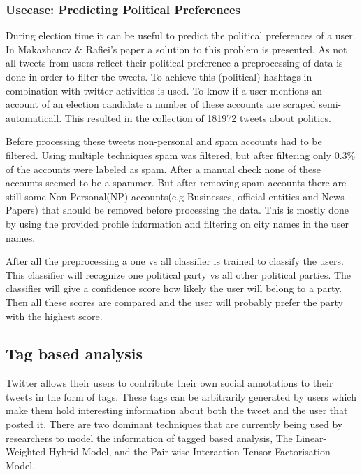 \documentclass{article}
\begin{document}
\subsubsection{Usecase: Predicting Political Preferences}
During election time it can be useful to predict the political preferences of a user. In Makazhanov \& Raﬁei's paper a solution to this problem is presented. As not all tweets from users reflect their political preference a preprocessing of data is done in order to filter the tweets. \cite{pol} To achieve this (political) hashtags in combination with twitter activities is used. To know if a user mentions an account of an election candidate a number of these accounts are scraped semi-automaticall. This resulted in the collection of 181972 tweets about politics.\cite{pol}

Before processing these tweets non-personal and spam accounts had to be filtered. Using multiple techniques spam was filtered, but after filtering only 0.3\% of the accounts were labeled as spam. After a manual check none of these accounts seemed to be a spammer. But after removing spam accounts there are still some Non-Personal(NP)-accounts(e.g Businesses, official entities and News Papers)  that should be removed before processing the data. This is mostly done by using the provided profile information and filtering on city names in the user names.  \cite{pol}

After all the preprocessing a one vs all classifier is trained to classify the users. This classifier will recognize one political party vs all other political parties. The classifier will give a confidence score how likely the user will belong to a party. Then all these scores are compared and the user will probably prefer the party with the highest score.  \cite{pol}
\subsection{Tag based analysis}

Twitter allows their users to contribute their own social annotations to their tweets in the form of tags. These tags can be arbitrarily generated by users 
which make them hold interesting information about both the tweet and the user that posted it. There are two dominant techniques that are currently being
used by researchers to model the information of tagged based analysis, The Linear-Weighted Hybrid Model, and the Pair-wise Interaction Tensor Factorisation Model\cite{TagBased}.
\end{document}
